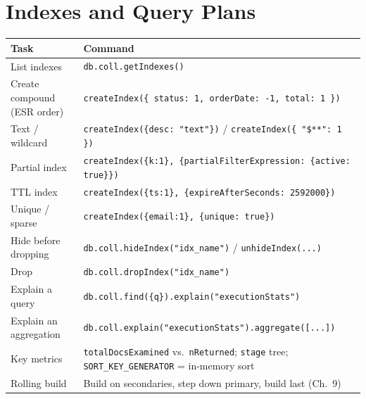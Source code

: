 \section{Indexes and Query Plans}
%
\begin{center}
\footnotesize
\begin{tabular}{@{}p{5.4cm}p{7.4cm}@{}}
\toprule
\textbf{Task} & \textbf{Command} \\
\midrule
List indexes & \texttt{db.coll.getIndexes()} \\
Create compound (ESR order) & \texttt{createIndex(\{ status: 1, orderDate: -1, total: 1 \})} \\
Text / wildcard & \texttt{createIndex(\{desc: "text"\})} / \texttt{createIndex(\{ "\$**": 1 \})} \\
Partial index & \texttt{createIndex(\{k:1\}, \{partialFilterExpression: \{active: true\}\})} \\
TTL index & \texttt{createIndex(\{ts:1\}, \{expireAfterSeconds: 2592000\})} \\
Unique / sparse & \texttt{createIndex(\{email:1\}, \{unique: true\})} \\
Hide before dropping & \texttt{db.coll.hideIndex("idx\_name")} / \texttt{unhideIndex(...)} \\
Drop & \texttt{db.coll.dropIndex("idx\_name")} \\
Explain a query & \texttt{db.coll.find(\{q\}).explain("executionStats")} \\
Explain an aggregation & \texttt{db.coll.explain("executionStats").aggregate([...])} \\
Key metrics & \texttt{totalDocsExamined} vs.\ \texttt{nReturned}; \texttt{stage} tree; \texttt{SORT\_KEY\_GENERATOR} = in-memory sort \\
Rolling build & Build on secondaries, step down primary, build last (Ch.~9) \\
\bottomrule
\end{tabular}
\end{center}

